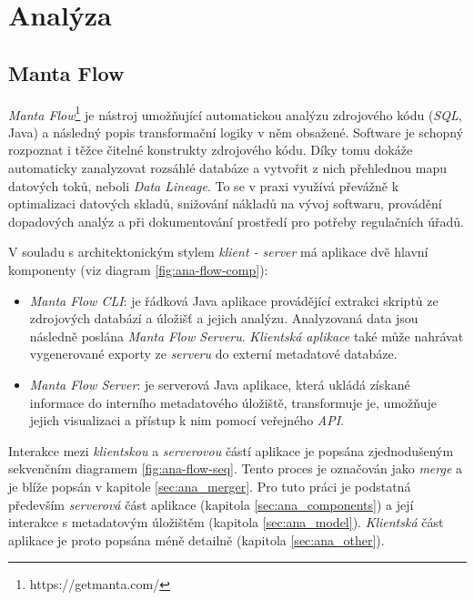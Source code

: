 \chapter{Analýza}
\section{Manta Flow}
\textit{Manta Flow}\footnote{https://getmanta.com/} je nástroj umožňující automatickou analýzu zdrojového kódu (\textit{SQL}, Java) a následný popis transformační logiky v něm obsažené. Software je schopný rozpoznat i těžce čitelné konstrukty zdrojového kódu. Díky tomu dokáže automaticky zanalyzovat rozsáhlé databáze a vytvořit z nich přehlednou mapu datových toků, neboli \textit{Data Lineage}. To se v praxi využívá převážně k optimalizaci datových skladů, snižování nákladů na vývoj softwaru, provádění dopadových analýz a při dokumentování prostředí pro potřeby regulačních úřadů.

V souladu s architektonickým stylem \textit{klient - server} má aplikace dvě hlavní komponenty (viz diagram \ref{fig:ana-flow-comp}):
\begin{itemize}
	\item{\textit{Manta Flow CLI}}: je řádková Java aplikace provádějící extrakci skriptů ze zdrojových databází a úložišť a jejich analýzu. Analyzovaná data jsou následně poslána \textit{Manta Flow Serveru}. \textit{Klientská aplikace} také může nahrávat vygenerované exporty ze \textit{serveru} do externí metadatové databáze.
	\item{\textit{Manta Flow Server}}: je serverová Java aplikace, která ukládá získané informace do interního metadatového úložiště, transformuje je, umožňuje jejich visualizaci a přístup k nim pomocí veřejného \textit{API}.
\end{itemize}

Interakce mezi \textit{klientskou} a \textit{serverovou} částí aplikace je popsána zjednodušeným sekvenčním diagramem \ref{fig:ana-flow-seq}. Tento proces je označován jako \textit{merge} a je blíže popsán v kapitole \ref{sec:ana_merger}.
Pro tuto práci je podstatná především \textit{serverová} část aplikace (kapitola \ref{sec:ana_components}) a její interakce s metadatovým úložištěm (kapitola \ref{sec:ana_model}). \textit{Klientská} část aplikace je proto popsána méně detailně (kapitola \ref{sec:ana_other}).


